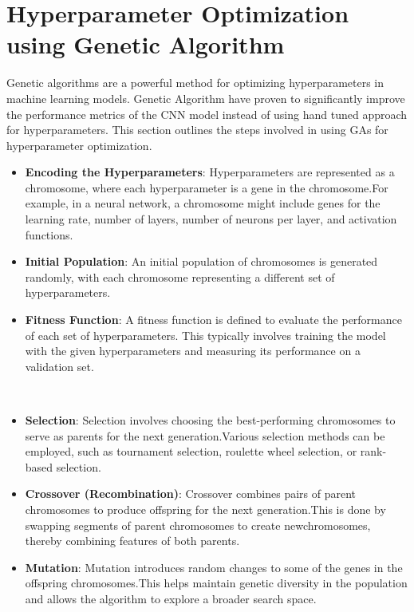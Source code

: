 \section{Hyperparameter Optimization using Genetic Algorithm}
Genetic algorithms are a powerful method for optimizing hyperparameters
in machine learning models. Genetic Algorithm have proven to significantly
improve the performance metrics of the CNN model instead of using hand tuned
approach for hyperparameters. This section outlines the steps involved in using
GAs for hyperparameter optimization\cite{9058307}.
\begin{itemize}
      \item \textbf{Encoding the Hyperparameters}:
                  Hyperparameters are represented as a chromosome, where each hyperparameter is a
                  gene in the chromosome.For example, in a neural network, a chromosome might include genes for the
                  learning rate, number of layers, number of neurons per layer, and activation functions.
            

      \item \textbf{Initial Population}:
            An initial population of chromosomes is generated randomly, with each chromosome representing a different set of hyperparameters.
            

      \item \textbf{Fitness Function}:
            A fitness function is defined to evaluate the performance of each set of hyperparameters. This typically involves training the model with the given hyperparameters and measuring its performance on a validation set.

      \\
      \item \textbf{Selection}:
            Selection involves choosing the best-performing chromosomes to serve as parents
                        for the next generation.Various selection methods can be employed, such as tournament selection,
                        roulette wheel selection, or rank-based selection.
            
            
      \item \textbf{Crossover (Recombination)}:
           Crossover combines pairs of parent chromosomes to produce offspring for the next generation.This is done by swapping segments of parent chromosomes to create newchromosomes, thereby combining features of both parents.
         

      \item \textbf{Mutation}:
             Mutation introduces random changes to some of the genes in the offspring
                        chromosomes.This helps maintain genetic diversity in the population and allows the
                        algorithm to explore a broader search space.
            


\end{itemize}
